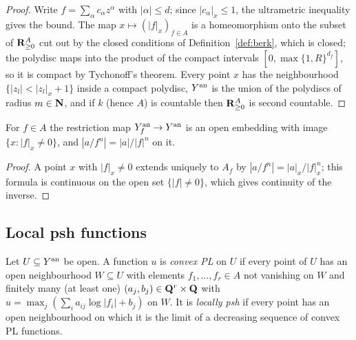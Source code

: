 \begin{proof}
Write $f=\sum_\alpha c_\alpha z^\alpha$ with $|\alpha|\le d$; since $|c_\alpha|_x\le1$, the
ultrametric inequality gives the bound. The map $x\mapsto(|f|_x)_{f\in A}$ is a homeomorphism
onto the subset of $\mathbf{R}_{\ge0}^A$ cut out by the closed conditions of Definition~\ref{def:berk},
which is closed; the polydisc maps into the product of the compact intervals
$[0,\max\{1,R\}^{d_f}]$, so it is compact by Tychonoff's theorem. Every point $x$ has the
neighbourhood $\{|z_l|<|z_l|_x+1\}$ inside a compact polydisc, $Y^{\mathrm{an}}$ is the union of the
polydiscs of radius $m\in\mathbf{N}$, and if $k$ (hence $A$) is countable then $\mathbf{R}_{\ge0}^A$ is second
countable.
\end{proof}

\begin{lemma}\label{lem:principal-open}
\leanok
{}
For $f\in A$ the restriction map $Y_f^{\mathrm{an}}\to Y^{\mathrm{an}}$ is an open embedding with image
$\{x:|f|_x\ne0\}$, and $|a/f^n|=|a|/|f|^n$ on it.
\end{lemma}

\begin{proof}
A point $x$ with $|f|_x\ne0$ extends uniquely to $A_f$ by $|a/f^n|=|a|_x/|f|_x^n$; this formula
is continuous on the open set $\{|f|\ne0\}$, which gives continuity of the inverse.
\end{proof}

\subsection{Local psh functions}\label{subsec:local-psh}

\begin{definition}\label{def:convex-pl}
\leanok
{}
Let $U\subseteq Y^{\mathrm{an}}$ be open. A function $u$ is \emph{convex PL} on $U$ if every point of $U$
has an open neighbourhood $W\subseteq U$ with elements $f_1,\dots,f_r\in A$ not vanishing on $W$
and finitely many (at least one) $(a_j,b_j)\in\mathbf{Q}^r\times\mathbf{Q}$ with
$u=\max_j(\sum_ia_{ij}\log|f_i|+b_j)$ on $W$. It is \emph{locally psh} if every point has an open
neighbourhood on which it is the limit of a decreasing sequence of convex PL functions.
\end{definition}

